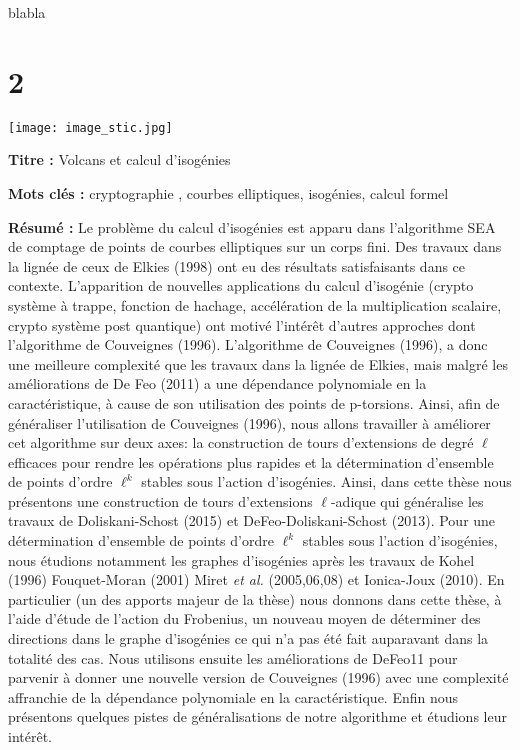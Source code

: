\documentclass[a4paper, titlepage, 12pt]{book}
\makeatletter
\newcommand*{\cleartoleftpage}{%
  \clearpage
    \if@twoside
    \ifodd\c@page
      \hbox{}\newpage
      \if@twocolumn
        \hbox{}\newpage
      \fi
    \fi
  \fi
}
\newcommand{\titre}{Volcans et calcul d'isogénies}
\makeatother
\begin{document}
blabla

\chapter{2}



\cleartoleftpage
\pagestyle{empty}
\texttt{[image: image\_stic.jpg]}

\vspace{1ex}

\begin{breakbox}

\noindent\textbf{Titre : }\titre

\vspace{2ex}

\noindent\textbf{Mots clés : }cryptographie , courbes elliptiques, isogénies, 
calcul formel

\begin{multicols}{2}
\noindent\textbf{Résumé : }
Le problème du calcul d'isogénies est apparu dans l'algorithme SEA de comptage
de points de courbes elliptiques sur un corps fini. Des travaux dans la lignée 
de ceux de Elkies (1998) ont eu des résultats satisfaisants dans ce contexte. 
L'apparition de nouvelles applications du calcul d'isogénie (crypto système à 
trappe, fonction de hachage, accélération de la multiplication scalaire, crypto
système post quantique) ont motivé l’intérêt d'autres approches dont 
l'algorithme de Couveignes (1996).  L'algorithme de Couveignes (1996), a donc 
une meilleure complexité que les travaux dans la lignée de Elkies, mais malgré 
les améliorations de De Feo (2011) a une dépendance polynomiale en la 
caractéristique, à cause de son utilisation des points de p-torsions. Ainsi, 
afin de généraliser l'utilisation de Couveignes (1996), nous allons travailler à améliorer cet algorithme sur deux axes: la construction de tours d'extensions de degré $\ell$ efficaces pour rendre les opérations plus rapides et la détermination d'ensemble de points d'ordre $\ell^k$ stables sous l'action d'isogénies. Ainsi, dans cette thèse nous présentons une construction de tours d'extensions $\ell$-adique qui généralise les travaux de Doliskani-Schost (2015) et DeFeo-Doliskani-Schost (2013). Pour une détermination d'ensemble de points d'ordre $\ell^k$ stables sous l'action d'isogénies, nous étudions notamment les graphes d'isogénies après les travaux de Kohel (1996) Fouquet-Moran (2001) Miret \emph{et al.} (2005,06,08) et Ionica-Joux (2010). En particulier (un des apports majeur de la thèse) nous donnons dans cette thèse, à l'aide d'étude de l'action du Frobenius, un nouveau moyen de déterminer des directions dans le graphe d'isogénies ce qui n'a pas été fait auparavant dans la totalité des cas. Nous utilisons ensuite les améliorations de DeFeo11 pour parvenir à donner une nouvelle version de Couveignes (1996) avec une complexité affranchie de la dépendance polynomiale en la caractéristique. Enfin nous présentons quelques pistes de généralisations de notre algorithme et étudions leur intérêt.
\end{multicols}
\end{breakbox}
\end{document}

